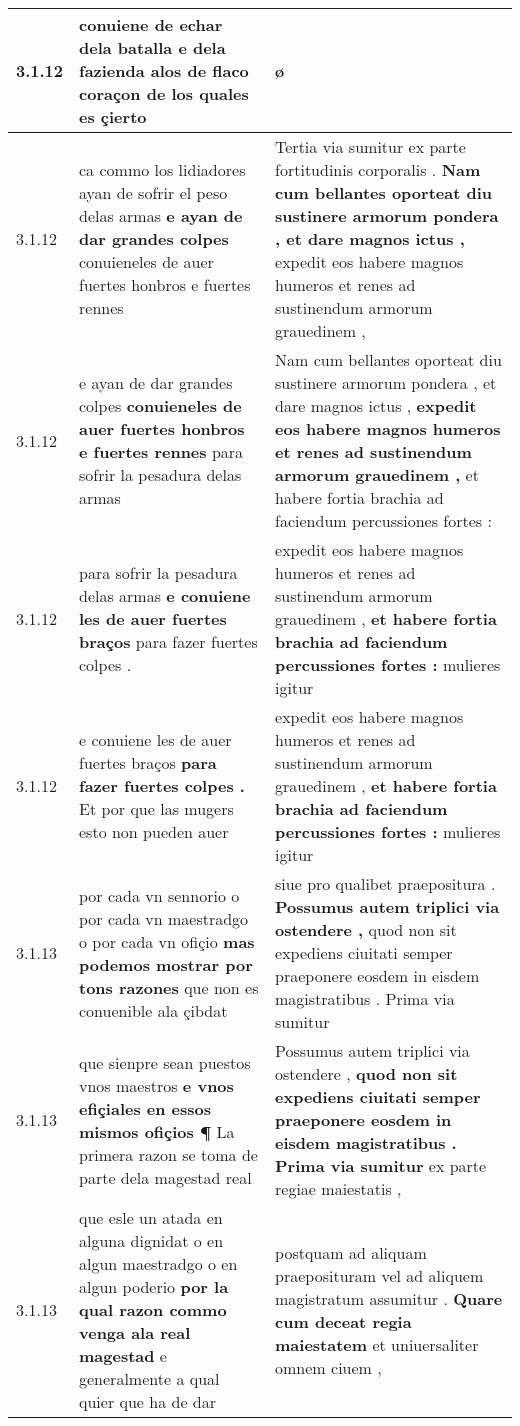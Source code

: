 \begin{tabular}{|p{1cm}|p{6.5cm}|p{6.5cm}|}
3.1.12 & conuiene de echar dela batalla \textbf{ e dela fazienda alos de flaco coraçon } de los quales es çierto & ø \\\hline
3.1.12 & ca commo los lidiadores ayan de sofrir el peso delas armas \textbf{ e ayan de dar grandes colpes } conuieneles de auer fuertes honbros e fuertes rennes & Tertia via sumitur ex parte fortitudinis corporalis . \textbf{ Nam cum bellantes oporteat diu sustinere armorum pondera , et dare magnos ictus , } expedit eos habere magnos humeros et renes ad sustinendum armorum grauedinem , \\\hline
3.1.12 & e ayan de dar grandes colpes \textbf{ conuieneles de auer fuertes honbros e fuertes rennes } para sofrir la pesadura delas armas & Nam cum bellantes oporteat diu sustinere armorum pondera , et dare magnos ictus , \textbf{ expedit eos habere magnos humeros et renes ad sustinendum armorum grauedinem , } et habere fortia brachia ad faciendum percussiones fortes : \\\hline
3.1.12 & para sofrir la pesadura delas armas \textbf{ e conuiene les de auer fuertes braços } para fazer fuertes colpes . & expedit eos habere magnos humeros et renes ad sustinendum armorum grauedinem , \textbf{ et habere fortia brachia ad faciendum percussiones fortes : } mulieres igitur \\\hline
3.1.12 & e conuiene les de auer fuertes braços \textbf{ para fazer fuertes colpes . } Et por que las mugers esto non pueden auer & expedit eos habere magnos humeros et renes ad sustinendum armorum grauedinem , \textbf{ et habere fortia brachia ad faciendum percussiones fortes : } mulieres igitur \\\hline
3.1.13 & por cada vn sennorio o por cada vn maestradgo o por cada vn ofiçio \textbf{ mas podemos mostrar por tons razones } que non es conuenible ala çibdat & siue pro qualibet praepositura . \textbf{ Possumus autem triplici via ostendere , } quod non sit expediens ciuitati semper praeponere eosdem in eisdem magistratibus . Prima via sumitur \\\hline
3.1.13 & que sienpre sean puestos vnos maestros \textbf{ e vnos efiçiales en essos mismos ofiçios ¶ } La primera razon se toma de parte dela magestad real & Possumus autem triplici via ostendere , \textbf{ quod non sit expediens ciuitati semper praeponere eosdem in eisdem magistratibus . Prima via sumitur } ex parte regiae maiestatis , \\\hline
3.1.13 & que esle un atada en alguna dignidat o en algun maestradgo o en algun poderio \textbf{ por la qual razon commo venga ala real magestad } e generalmente a qual quier que ha de dar & postquam ad aliquam praeposituram vel ad aliquem magistratum assumitur . \textbf{ Quare cum deceat regia maiestatem } et uniuersaliter omnem ciuem , \\\hline

\end{tabular}
